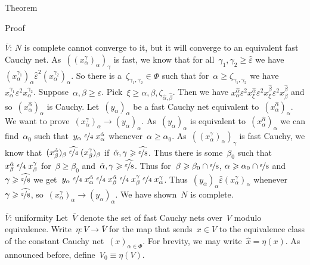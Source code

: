 \documentclass[b]{subfiles}
\begin{document}
\begin{parsec}
\begin{point}{Theorem}
\begin{point}{Proof}
\begin{point}{$\overline{V}$: $N$ is complete}
    cannot converge to it,
    but it will converge to an equivalent fast Cauchy net.
As~$((x^\gamma_\alpha)_\alpha)_\gamma$
    is fast,
    we know that for all~$\gamma_1,\gamma_2 \geq \hat\varepsilon$
we have~$
(x^{\gamma_1}_\alpha)_\alpha \mathrel{\hat\varepsilon^2}
        (x^{\gamma_2}_\alpha)_\alpha$.
So there is a~$\zeta_{\gamma_1,\gamma_2} \in \Phi$
such that for~$\alpha \geq \zeta_{\gamma_1,\gamma_2}$
    we have~$x^{\gamma_1}_\alpha
        \mathrel{\varepsilon^2}
        x^{\gamma_2}_\alpha$.
Suppose~$\alpha,\beta \geq \varepsilon$.
Pick~$\xi \geq \alpha,\beta,\zeta_{\hat\alpha,\hat\beta}$.
Then we have $ x^{\hat{\alpha}}_\alpha
            \mathrel{\varepsilon^2}
        x^{\hat{\alpha}}_\xi
            \mathrel{\varepsilon^2}
        x^{\hat{\beta}}_\xi
            \mathrel{\varepsilon^2}
            x^{\hat{\beta}}_\beta$ and so~$(x_\alpha^{\hat\alpha})_\alpha$
            is Cauchy.
Let~$(y_\alpha)_\alpha$ be a fast Cauchy net equivalent
to~$(x^{\hat\alpha}_\alpha)_\alpha$.
We want to prove~$(x^\gamma_\alpha)_\alpha \to (y_\alpha)_\alpha$.
As~$(y_\alpha)_\alpha$ is equivalent to~$(x^{\hat\alpha}_\alpha)_\alpha$
    we can find~$\alpha_0$
    such that~$y_\alpha \mathrel{\nicefrac{\varepsilon}{4}} x^{\hat\alpha}_\alpha$
    whenever~$\alpha \geq \alpha_0$.
As~$((x^\gamma_\alpha)_\alpha)_\gamma$
is fast Cauchy,
we know that~$(x^{\hat\alpha}_\beta)_\beta
\mathrel{\widehat{\nicefrac{\varepsilon}{4}}}
(x^\gamma_\beta)_\beta $
if~$\hat{\alpha}, \gamma \geq \widehat{\nicefrac{\varepsilon}{8}}$.
Thus there is some~$\beta_0$ such
that~$x^{\hat\alpha}_\beta
\mathrel{\nicefrac{\varepsilon}{4}}
x^\gamma_\beta $
for~$\beta \geq \beta_0$
and~$\hat{\alpha}, \gamma \geq \widehat{\nicefrac{\varepsilon}{8}}$.
Thus for~$\beta \geq \beta_0 \cap \nicefrac{\varepsilon}{8}$,
$\alpha \geq \alpha_0 \cap \nicefrac{\varepsilon}{8}$
and~$\gamma \geq \widehat{\nicefrac{\varepsilon}{8}}$
we get~$y_\alpha
\mathrel{\nicefrac{\varepsilon}{4}}
x^{\hat{\alpha}}_\alpha
\mathrel{\nicefrac{\varepsilon}{4}}
x^{\hat{\alpha}}_\beta
\mathrel{\nicefrac{\varepsilon}{4}}
x^\gamma_\beta
\mathrel{\nicefrac{\varepsilon}{4}}
x^\gamma_\alpha$.
Thus~$(y_\alpha)_\alpha \mathrel{\hat\varepsilon} (x^\gamma_\alpha)_\alpha$
whenever~$\gamma \geq \widehat{\nicefrac{\varepsilon}{8}}$,
so~$(x^\gamma_\alpha)_\alpha \to (y_\alpha)_\alpha$.
We have shown~$N$ is complete.
\end{point}
\begin{point}{$\overline{V}$: uniformity}%
Let~$\overline{V}$ denote the set of fast Cauchy nets over~$V$
    modulo equivalence.
Write~$\eta\colon V \to \overline{V}$
for the map that sends~$x \in V$
to the equivalence class of the constant Cauchy net~$(x)_{\alpha \in \Phi}$.
For brevity, we may write~$\hat{x} = \eta(x)$.
As announced before, define~$V_0 \equiv \eta(V)$.


\end{point}
\end{point}
\end{point}
\end{parsec}
\end{document}
